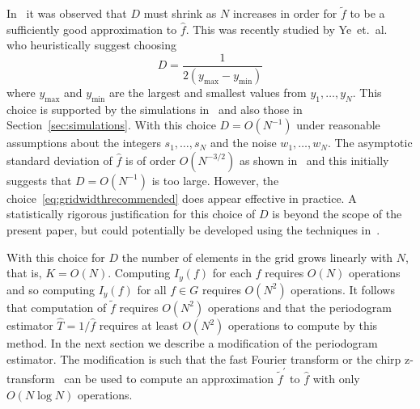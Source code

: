 \documentclass[10pt,twocolumn,twoside]{IEEEtran}
\begin{document}
\newcommand{\ymax}{y_{\text{max}}}
\newcommand{\ymin}{y_{\text{min}}}

In~\cite{McKilliam2007} it was observed that $D$ must shrink as $N$ increases in order for $\widetilde{f}$ to be a sufficiently good approximation to $\hat{f}$.  This was recently studied by Ye~et.~al.~\cite{Haohuan2013435,6492742} who heuristically suggest choosing
\begin{equation}\label{eq:gridwidthrecommended}
D = \frac{1}{2(\ymax - \ymin)}
\end{equation}
where $\ymax$ and $\ymin$ are the largest and smallest values from $y_1,\dots,y_N$.  This choice is supported by the simulations in~\cite{Haohuan2013435,6492742} and also those in Section~\ref{sec:simulations}.  With this choice $D = O(N^{-1})$ under reasonable assumptions about the integers $s_1,\dots,s_N$ and the noise $w_1,\dots,w_N$.  The asymptotic standard deviation of $\hat{f}$ is of order $O(N^{-3/2})$ as shown in~\cite{Quinn20013asilomar_period_est} and this initially suggests that $D = O(N^{-1})$ is too large.  However, the choice~\eqref{eq:gridwidthrecommended} does appear effective in practice.  A statistically rigorous justification for this choice of $D$ is beyond the scope of the present paper, but could potentially be developed using the techniques in~\cite{Quinn2008maximizing_the_periodogram}.

With this choice for $D$ the number of elements in the grid grows linearly with $N$, that is, $K = O(N)$.  Computing $I_y(f)$ for each $f$ requires $O(N)$ operations and so computing $I_y(f)$ for all $f \in G$ requires $O(N^2)$ operations.  It follows that computation of $\widetilde{f}$ requires $O(N^2)$ operations and that the periodogram estimator $\hat{T} = 1/\hat{f}$ requires at least $O(N^2)$ operations to compute by this method.  %
In the next section we describe a modification of the periodogram estimator.  The modification is such that the fast Fourier transform or the chirp z-transform~\cite{Rabiner1969} can be used to compute an approximation $\widetilde{f}^\prime$ to $\hat{f}$ with only $O(N\log N)$ operations.
\end{document}
